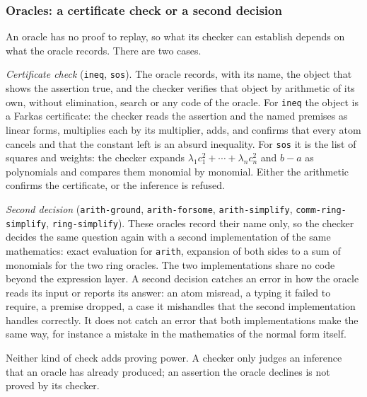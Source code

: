 \subsubsection*{Oracles: a certificate check or a second decision}

An oracle has no proof to replay, so what its checker can establish
depends on what the oracle records.  There are two cases.

\emph{Certificate check} (\texttt{ineq}, \texttt{sos}).  The oracle
records, with its name, the object that shows the assertion true, and
the checker verifies that object by arithmetic of its own, without
elimination, search or any code of the oracle.  For \texttt{ineq} the
object is a Farkas certificate: the checker reads the assertion and the
named premises as linear forms, multiplies each by its multiplier, adds,
and confirms that every atom cancels and that the constant left is an
absurd inequality.  For \texttt{sos} it is the list of squares and
weights: the checker expands $\lambda_1 c_1^2 + \cdots + \lambda_n c_n^2$
and $b - a$ as polynomials and compares them monomial by monomial.  Either
the arithmetic confirms the certificate, or the inference is refused.

\begin{sloppypar}
\emph{Second decision} (\texttt{arith-ground}, \texttt{arith-forsome},
\texttt{arith-simplify}, \texttt{comm-ring-simplify},
\texttt{ring-simplify}).  These oracles record their name only, so the
checker decides the same question again with a second implementation of
the same mathematics: exact evaluation for \texttt{arith}, expansion of
both sides to a sum of monomials for the two ring oracles.  The two
implementations share no code beyond the expression layer.  A second
decision catches an error in how the oracle reads its input or reports
its answer: an atom misread, a typing it failed to require, a premise
dropped, a case it mishandles that the second implementation handles
correctly.  It does not catch an error that both implementations make
the same way, for instance a mistake in the mathematics of the normal
form itself.
\end{sloppypar}

Neither kind of check adds proving power.  A checker only judges an
inference that an oracle has already produced; an assertion the oracle
declines is not proved by its checker.

